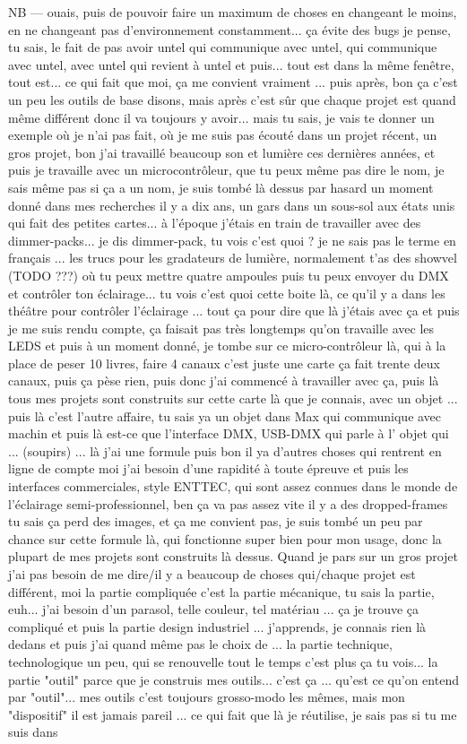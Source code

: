 NB — ouais, puis de pouvoir faire un maximum de choses en changeant le moins, en ne changeant pas d'environnement constamment... ça évite des bugs je pense, tu sais, le fait de pas avoir untel qui communique avec untel, qui communique avec untel, avec untel qui revient à untel et puis... tout est dans la même fenêtre, tout est... ce qui fait que moi, ça me convient vraiment ... puis après, bon ça c'est un peu  les outils de base disons, mais après c'est sûr que chaque projet est quand même différent donc il va toujours y avoir... mais tu sais, je vais te donner un exemple où je n'ai pas fait, où je me suis pas écouté dans un projet récent, un gros projet, bon j'ai travaillé beaucoup son et lumière ces dernières années, et puis je travaille avec un microcontrôleur, que tu peux même pas dire le nom, je sais même pas si ça a un nom,  je suis tombé là dessus par hasard un moment donné dans mes recherches il y a dix ans, un gars dans un sous-sol aux états unis qui fait des petites cartes... à l'époque j'étais en train de travailler avec des dimmer-packs... je dis dimmer-pack, tu vois c'est quoi ? je ne sais pas le terme en français ...  les trucs pour les gradateurs de lumière, normalement t'as des showvel (TODO ???) où tu peux mettre quatre ampoules puis tu peux envoyer du DMX et contrôler ton éclairage... tu vois c'est quoi cette boite là, ce qu'il y a dans les théâtre pour contrôler l'éclairage ... tout ça pour dire que là j'étais avec ça et puis je me suis rendu compte, ça faisait pas très longtemps qu'on travaille avec les LEDS et puis à un moment donné, je tombe sur ce micro-contrôleur là, qui à la place de peser 10 livres, faire 4 canaux c'est juste une carte ça fait trente deux canaux, puis ça pèse rien, puis donc j'ai commencé à travailler avec ça, puis là tous mes projets sont construits sur cette carte là que je connais, avec un objet ... puis là c'est l'autre affaire, tu sais ya un objet dans Max qui communique avec machin et puis là est-ce que l'interface DMX, USB-DMX qui parle à l' objet qui ... (soupirs) ... là j'ai une formule puis bon il ya d'autres choses qui rentrent en ligne de compte moi j'ai besoin d'une rapidité à toute épreuve et puis les interfaces commerciales, style ENTTEC, qui sont assez connues dans le monde de l'éclairage semi-professionnel, ben ça va pas assez vite il y a des dropped-frames tu sais ça perd des images, et ça me convient pas, je suis tombé un peu par chance sur cette formule là, qui fonctionne super bien pour mon usage, donc la plupart de mes projets sont construits là dessus. Quand je pars sur un gros projet j'ai pas besoin de me dire/il y a beaucoup de choses qui/chaque projet est différent, moi la partie compliquée c'est la partie mécanique, tu sais la partie, euh...  j'ai besoin d'un parasol, telle couleur, tel matériau ... ça je trouve ça compliqué et puis la partie design industriel ... j'apprends, je connais rien là dedans et puis j'ai quand même pas le choix de ... la partie technique, technologique un peu, qui se renouvelle tout le temps c'est plus ça tu vois... la partie "outil" parce que je construis mes outils... c'est ça ... qu'est ce qu'on entend par "outil"... mes outils c'est toujours grosso-modo les mêmes, mais mon "dispositif" il est jamais pareil ...  ce qui fait que là je réutilise, je sais pas si tu me suis dans 